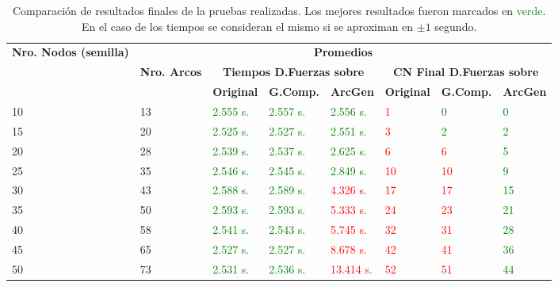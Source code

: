 \begin{table}[H]
	\caption{Comparación de resultados finales de la pruebas realizadas. Los mejores resultados fueron marcados en \textcolor{green}{verde}. En el caso de los tiempos se consideran el mismo si se aproximan en $\pm1$ segundo.}
	\label{tab:resultados_comparacion}
	\begin{tabularx}{\linewidth}{|X|X|X|X|X|X|X|X|}
		\hline
		\multirow{3}{2cm}{\textbf{Nro. Nodos (semilla)}} & \multicolumn{7}{c|}{\textbf{Promedios}} \\
        \cline{2-8} & \multirow{2}{2cm}{\textbf{Nro. Arcos}} & \multicolumn{3}{c|}{\textbf{Tiempos D.Fuerzas sobre}} & \multicolumn{3}{c|}{\textbf{CN Final D.Fuerzas sobre}} \\
		\cline{3-8} & & \textbf{Original} & \textbf{G.Comp.} & \textbf{ArcGen} & \textbf{Original} & \textbf{G.Comp.} & \textbf{ArcGen} \\
		\hline
		10 & 13 & \textcolor{green}{2.555 s.} & \textcolor{green}{2.557 s.} & \textcolor{green}{2.556 s.} & \textcolor{red}{1} & \textcolor{green}{0} & \textcolor{green}{0} \\
		\hline
		15 & 20 & \textcolor{green}{2.525 s.} & \textcolor{green}{2.527 s.} & \textcolor{green}{2.551 s.} & \textcolor{red}{3} & \textcolor{green}{2} & \textcolor{green}{2} \\
		\hline
		20 & 28 & \textcolor{green}{2.539 s.} & \textcolor{green}{2.537 s.} & \textcolor{green}{2.625 s.} & \textcolor{red}{6} & \textcolor{red}{6} & \textcolor{green}{5} \\
		\hline
		25 & 35 & \textcolor{green}{2.546 s.} & \textcolor{green}{2.545 s.} & \textcolor{green}{2.849 s.} & \textcolor{red}{10} & \textcolor{red}{10} & \textcolor{green}{9} \\
		\hline
		30 & 43 & \textcolor{green}{2.588 s.} & \textcolor{green}{2.589 s.} & \textcolor{red}{4.326 s.} & \textcolor{red}{17} & \textcolor{red}{17} & \textcolor{green}{15} \\
		\hline
		35 & 50 & \textcolor{green}{2.593 s.} & \textcolor{green}{2.593 s.} & \textcolor{red}{5.333 s.} & \textcolor{red}{24} & \textcolor{red}{23} & \textcolor{green}{21} \\
		\hline
		40 & 58 & \textcolor{green}{2.541 s.} & \textcolor{green}{2.543 s.} & \textcolor{red}{5.745 s.} & \textcolor{red}{32} & \textcolor{red}{31} & \textcolor{green}{28} \\
		\hline
		45 & 65 & \textcolor{green}{2.527 s.} & \textcolor{green}{2.527 s.} & \textcolor{red}{8.678 s.} & \textcolor{red}{42} & \textcolor{red}{41} & \textcolor{green}{36} \\
		\hline
		50 & 73 & \textcolor{green}{2.531 s.} & \textcolor{green}{2.536 s.} & \textcolor{red}{13.414 s.} & \textcolor{red}{52} & \textcolor{red}{51} & \textcolor{green}{44} \\
		\hline
	\end{tabularx}
\end{table}

